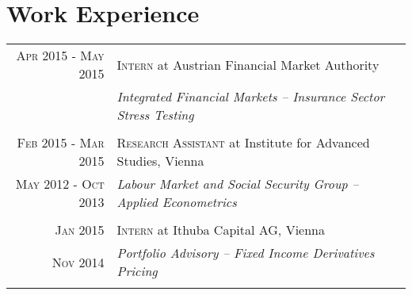\documentclass[a4paper,11pt]{article}
\begin{document}
\section{Work Experience}
\centering
\begin{tabularx}{1\linewidth}{r|p{11cm}}
\textsc{Apr 2015 - May 2015} & \textsc{Intern} at Austrian Financial Market Authority\\
 & \emph{Integrated Financial Markets -- Insurance Sector Stress Testing}\\ 
\multicolumn{2}{c}{} \\
\textsc{Feb 2015 - Mar 2015} & \textsc{Research Assistant} at Institute for Advanced Studies, Vienna\\
\textsc{May 2012 - Oct 2013} & \emph{Labour Market and Social Security Group -- Applied Econometrics}\\
\multicolumn{2}{c}{} \\
\textsc{Jan 2015} & \textsc{Intern} at Ithuba Capital AG, Vienna \\
\textsc{Nov 2014}& \emph{Portfolio Advisory -- Fixed Income Derivatives Pricing}\\ 
\multicolumn{2}{c}{} \\
\end{tabularx}
\end{document}
